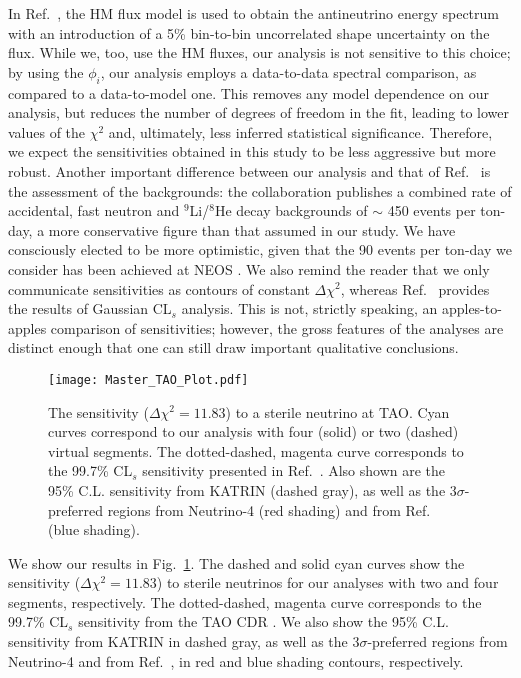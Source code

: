 \documentclass[prd, twocolumn, tightenlines, twoside, secnumarabic, superscriptaddress, preprintnumbers, nofootinbib, notitlepage]{revtex4-1}
\begin{document}
In Ref.~\cite{Abusleme:2020bzt}, the HM flux model \cite{Mueller:2011nm,Huber:2011wv} is used to obtain the antineutrino energy spectrum with an introduction of a 5\% bin-to-bin uncorrelated shape uncertainty on the flux. While we, too, use the HM fluxes, our analysis is not sensitive to this choice; by using the $\phi_{i}$, our analysis employs a data-to-data spectral comparison, as compared to a data-to-model one. This removes any model dependence on our analysis, but reduces the number of degrees of freedom in the fit, leading to lower values of the $\chi^2$ and, ultimately, less inferred statistical significance. Therefore, we expect the sensitivities obtained in this study to be less aggressive but more robust. Another important difference between our analysis and that of Ref.~\cite{Abusleme:2020bzt} is the assessment of the backgrounds: the collaboration publishes a combined rate of accidental, fast neutron and $^9$Li/$^8$He decay backgrounds of $\sim$ 450 events per ton-day, a more conservative figure than that assumed in our study. We have consciously elected to be more optimistic, given that the 90 events per ton-day we consider has been achieved at NEOS \cite{NEOS:2016wee}. We also remind the reader that we only communicate sensitivities as contours of constant $\Delta \chi^2$, whereas Ref.~\cite{Abusleme:2020bzt} provides the results of Gaussian CL$_s$ analysis. This is not, strictly speaking, an apples-to-apples comparison of sensitivities; however, the gross features of the analyses are distinct enough that one can still draw important qualitative conclusions.

\begin{figure}[!t]
    \texttt{[image: Master\_TAO\_Plot.pdf]}
    \caption{The sensitivity ($\Delta \chi^2 = 11.83$) to a sterile neutrino at TAO. Cyan curves correspond to our analysis with four (solid) or two (dashed) virtual segments. The dotted-dashed, magenta curve corresponds to the 99.7\% CL$_s$ sensitivity presented in Ref.~\cite{Abusleme:2020bzt}. Also shown are the 95\% C.L. sensitivity from KATRIN (dashed gray), as well as the $3\sigma$-preferred regions from Neutrino-4 \cite{Neutrino4talk} (red shading) and from Ref.~\cite{Berryman:2020agd} (blue shading).}
    \label{fig:TAO_segmented}
\end{figure}

We show our results in Fig.~\ref{fig:TAO_segmented}. The dashed and solid cyan curves show the sensitivity ($\Delta \chi^2 = 11.83$) to sterile neutrinos for our analyses with two and four segments, respectively. The dotted-dashed, magenta curve corresponds to the 99.7\% CL$_s$ sensitivity from the TAO CDR \cite{Abusleme:2020bzt}. We also show the 95\% C.L. sensitivity from KATRIN in dashed gray, as well as the $3\sigma$-preferred regions from Neutrino-4 \cite{Neutrino4talk} and from Ref.~\cite{Berryman:2020agd}, in red and blue shading contours, respectively.
\end{document}
